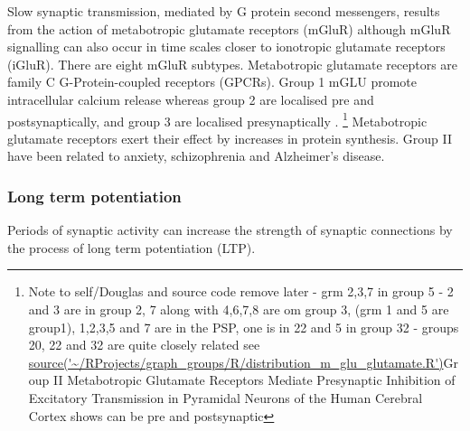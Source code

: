 Slow synaptic transmission, mediated by G protein second messengers, results from the action of metabotropic glutamate receptors (mGluR) \cite{niswender2010metabotropic} although mGluR signalling can also occur in time scales closer to ionotropic glutamate receptors (iGluR). There are eight mGluR subtypes. Metabotropic glutamate receptors are family C G-Protein-coupled receptors (GPCRs). Group 1 mGLU promote intracellular calcium release whereas group 2 are localised pre and postsynaptically, and group 3 are localised presynaptically \cite{niswender2010metabotropic}. 
\footnote{Note to self/Douglas and source code remove later - grm 2,3,7 in group 5 - 2 and 3 are in group 2, 7 along with 4,6,7,8 are om group 3, (grm 1 and 5 are group1), 1,2,3,5 and 7 are in the PSP, one is in 22 and 5 in group 32 - groups 20, 22 and 32 are quite closely related see \url{ source('~/RProjects/graph_groups/R/distribution_m_glu_glutamate.R')}Group II Metabotropic Glutamate Receptors Mediate Presynaptic Inhibition of Excitatory Transmission in Pyramidal Neurons of the Human Cerebral Cortex shows can be pre and postsynaptic } %
Metabotropic glutamate receptors exert their effect by increases in protein synthesis. Group II have been related to anxiety, schizophrenia and Alzheimer's disease\cite{swanson2005metabotropic}.


\subsubsection{Long term potentiation}
\label{sec:LismanLTP}
Periods of synaptic activity can increase the strength of synaptic connections by the process of long term potentiation (LTP).

